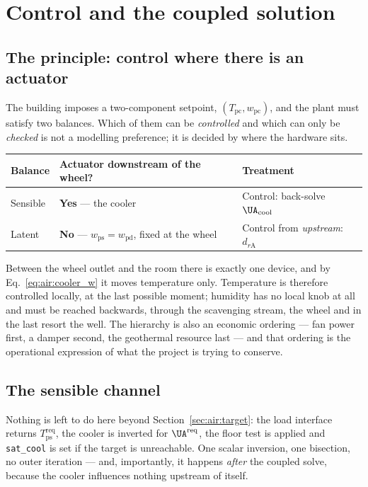 \section{Control and the coupled solution}
\label{sec:air:control}

\subsection{The principle: control where there is an actuator}
\label{sec:air:principle}

The building imposes a two-component setpoint, $(T_{\mathrm{pc}},
w_{\mathrm{pc}})$, and the plant must satisfy two balances. Which of them can
be \emph{controlled} and which can only be \emph{checked} is not a modelling
preference; it is decided by where the hardware sits.

\begin{center}
\begin{tabular}{@{}lll@{}}
\toprule
Balance & Actuator downstream of the wheel? & Treatment \\
\midrule
Sensible & \textbf{Yes} --- the cooler & Control: back-solve $\UA_{\mathrm{cool}}$ \\
Latent   & \textbf{No} --- $w_{\mathrm{ps}}=w_{\mathrm{pd}}$, fixed at the wheel & Control from \emph{upstream}: $d_{r\mathrm{A}}$ \\
\bottomrule
\end{tabular}
\end{center}

Between the wheel outlet and the room there is exactly one device, and by
Eq.~\eqref{eq:air:cooler_w} it moves temperature only. Temperature is therefore
controlled locally, at the last possible moment; humidity has no local knob at
all and must be reached backwards, through the scavenging stream, the wheel and
in the last resort the well. The hierarchy is also an economic ordering ---
fan power first, a damper second, the geothermal resource last --- and that
ordering is the operational expression of what the project is trying to
conserve.

\subsection{The sensible channel}
\label{sec:air:sensible}

Nothing is left to do here beyond Section~\ref{sec:air:target}: the load
interface returns $T_{\mathrm{ps}}^{\mathrm{req}}$, the cooler is inverted for
$\UA^{\mathrm{req}}$, the floor test is applied and \texttt{sat\_cool} is set
if the target is unreachable. One scalar inversion, one bisection, no outer
iteration --- and, importantly, it happens \emph{after} the coupled solve,
because the cooler influences nothing upstream of itself.

